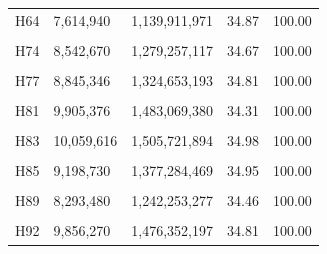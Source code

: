 \documentclass[
  a4paper,
  titlepage]{article}
\begin{document}
\begin{longtable}[t]{lllll}
H64 & 7,614,940 & 1,139,911,971 & 34.87 & 100.00\\
 
\cellcolor{gray!6}{H70} & \cellcolor{gray!6}{9,560,600} & \cellcolor{gray!6}{1,431,845,110} & \cellcolor{gray!6}{34.51} & \cellcolor{gray!6}{100.00}\\
 
H74 & 8,542,670 & 1,279,257,117 & 34.67 & 100.00\\
 
\cellcolor{gray!6}{H76} & \cellcolor{gray!6}{8,614,514} & \cellcolor{gray!6}{1,289,687,778} & \cellcolor{gray!6}{35.26} & \cellcolor{gray!6}{100.00}\\
 
H77 & 8,845,346 & 1,324,653,193 & 34.81 & 100.00\\
 
\cellcolor{gray!6}{H80} & \cellcolor{gray!6}{8,075,084} & \cellcolor{gray!6}{1,209,394,226} & \cellcolor{gray!6}{35.03} & \cellcolor{gray!6}{100.00}\\
 
H81 & 9,905,376 & 1,483,069,380 & 34.31 & 100.00\\
 
\cellcolor{gray!6}{H82} & \cellcolor{gray!6}{8,330,764} & \cellcolor{gray!6}{1,247,241,967} & \cellcolor{gray!6}{34.65} & \cellcolor{gray!6}{100.00}\\
 
H83 & 10,059,616 & 1,505,721,894 & 34.98 & 100.00\\
 
\cellcolor{gray!6}{H84} & \cellcolor{gray!6}{9,406,078} & \cellcolor{gray!6}{1,408,826,710} & \cellcolor{gray!6}{34.82} & \cellcolor{gray!6}{100.00}\\
 
H85 & 9,198,730 & 1,377,284,469 & 34.95 & 100.00\\
 
\cellcolor{gray!6}{H87} & \cellcolor{gray!6}{8,920,732} & \cellcolor{gray!6}{1,335,589,305} & \cellcolor{gray!6}{35.23} & \cellcolor{gray!6}{100.00}\\
 
H89 & 8,293,480 & 1,242,253,277 & 34.46 & 100.00\\
 
\cellcolor{gray!6}{H91} & \cellcolor{gray!6}{7,435,980} & \cellcolor{gray!6}{1,113,669,081} & \cellcolor{gray!6}{34.60} & \cellcolor{gray!6}{100.00}\\
 
H92 & 9,856,270 & 1,476,352,197 & 34.81 & 100.00\\
 

\end{longtable}
\end{document}
